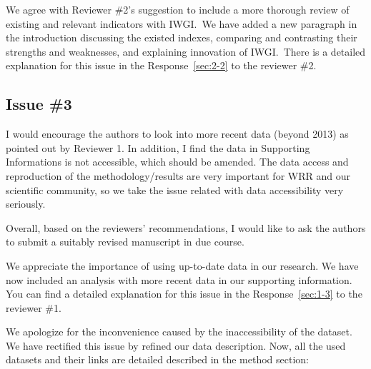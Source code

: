 \AR{} We agree with Reviewer \#2's suggestion to include a more thorough review of existing and relevant indicators with IWGI.\ We have added a new paragraph in the introduction discussing the existed indexes, comparing and contrasting their strengths and weaknesses, and explaining innovation of IWGI.\ There is a detailed explanation for this issue in the Response~\ref{sec:2-2} to the reviewer \#2.

\subsection{Issue \#3}
\RC{} I would encourage the authors to look into more recent data (beyond 2013) as pointed out by Reviewer 1. In addition, I find the data in Supporting Informations is not accessible, which should be amended. The data access and reproduction of the methodology/results are very important for WRR and our scientific community, so we take the issue related with data accessibility very seriously.

\RC*{} Overall, based on the reviewers' recommendations, I would like to ask the authors to submit a suitably revised manuscript in due course.

\AR{} We appreciate the importance of using up-to-date data in our research. We have now included an analysis with more recent data in our supporting information. You can find a detailed explanation for this issue in the Response~\ref{sec:1-3} to the reviewer \#1.

\AR*{} We apologize for the inconvenience caused by the inaccessibility of the dataset. We have rectified this issue by refined our data description. Now, all the used datasets and their links are detailed described in the method section:

